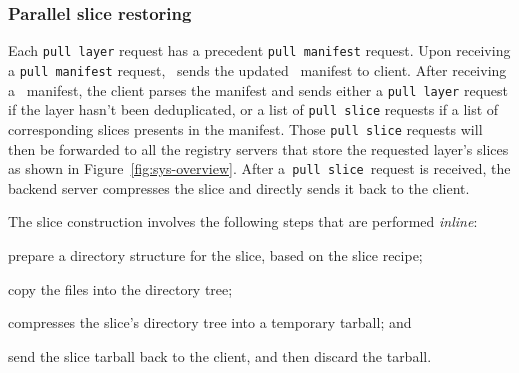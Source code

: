 \subsubsection{Parallel slice restoring}
Each \texttt{pull layer} request has a precedent \texttt{pull manifest} request.
Upon receiving a \texttt{pull manifest} request, 
\sysname~sends the updated \sysname~manifest to client.
After receiving a \sysname~manifest, the client parses the manifest
and sends either a \texttt{pull layer} request if the layer hasn't been deduplicated,
or a list of \texttt{pull slice} requests if a list of corresponding slices presents in the manifest.
Those \texttt{pull slice} requests will then be
forwarded to all the registry servers that store the requested
layer's slices as shown in Figure~\ref{fig:sys-overview}. 
After a~\texttt{pull slice}~request is received, the backend server compresses the slice 
and directly sends it back to the client.

The slice construction involves the following steps that are performed \emph{inline}:


\begin{compactenumerate}
	\item prepare a directory structure for the slice, based on the slice recipe;
	\item copy the files into the directory tree; 
	\item compresses the slice's directory tree into a temporary tarball; and
	\item send the slice tarball back to the client, and then discard the tarball.
\end{compactenumerate}

